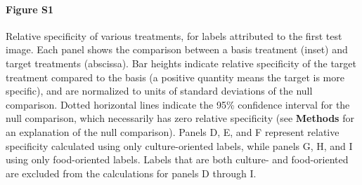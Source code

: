 \documentclass[a4paper]{report}
\begin{document}
\paragraph{Figure S1}
Relative specificity of various treatments, for labels attributed
to the first test image.
Each panel shows the comparison between a basis treatment (inset) and 
target treatments (abscissa).
Bar heights indicate relative specificity of the target 
treatment compared to the basis (a positive quantity means the target 
is more specific), and are normalized to units of standard 
deviations of the null comparison.  Dotted horizontal lines indicate
the 95\% confidence interval for the null comparison, which necessarily
has zero relative specificity (see \textbf{Methods} 
for an explanation of the null comparison).  Panels D, E, and F 
represent relative specificity calculated using only culture-oriented
labels, while panels G, H, and I using only food-oriented labels.
Labels that are both culture- and food-oriented are excluded from the
calculations for panels D through I.
\end{document}
